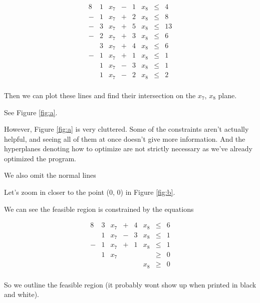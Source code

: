 \documentclass[12pt,letterpaper]{article}
\begin{document}
\begin{enumerate}
      \begin{alignat*}{8}
              & 1 & x_7 & {}-{} & 1 & x_8 & {}\leq{} & 4  \\
        {}-{} & 1 & x_7 & {}+{} & 2 & x_8 & {}\leq{} & 8  \\
        {}-{} & 3 & x_7 & {}+{} & 5 & x_8 & {}\leq{} & 13 \\
        {}-{} & 2 & x_7 & {}+{} & 3 & x_8 & {}\leq{} & 6  \\
              & 3 & x_7 & {}+{} & 4 & x_8 & {}\leq{} & 6  \\
        {}-{} & 1 & x_7 & {}+{} & 1 & x_8 & {}\leq{} & 1  \\
              & 1 & x_7 & {}-{} & 3 & x_8 & {}\leq{} & 1  \\
              & 1 & x_7 & {}-{} & 2 & x_8 & {}\leq{} & 2  \\
      \end{alignat*}

      Then we can plot these lines and find their intersection on the $x_7$, $x_8$ plane.

      See Figure \ref{fig:a}.

      However, Figure \ref{fig:a} is very cluttered.
      Some of the constraints aren't actually helpful,
      and seeing all of them at once doesn't give more information.
      And the hyperplanes denoting how to optimize are not strictly necessary as we've already optimized the program.

      We also omit the normal lines

      Let's zoom in closer to the point (0, 0) in Figure \ref{fig:b}.

      We can see the feasible region is constrained by the equations

      \begin{alignat*}{8}
              & 3 & x_7 & {}+{} & 4 & x_8 & {}\leq{} & 6  \\
              & 1 & x_7 & {}-{} & 3 & x_8 & {}\leq{} & 1  \\
        {}-{} & 1 & x_7 & {}+{} & 1 & x_8 & {}\leq{} & 1  \\
              & 1 & x_7 &       &   &     & {}\geq{} & 0  \\
              &   &     &       &   & x_8 & {}\geq{} & 0  \\
      \end{alignat*}

      So we outline the feasible region (it probably wont show up when printed in black and white).


\end{enumerate}
\end{document}
